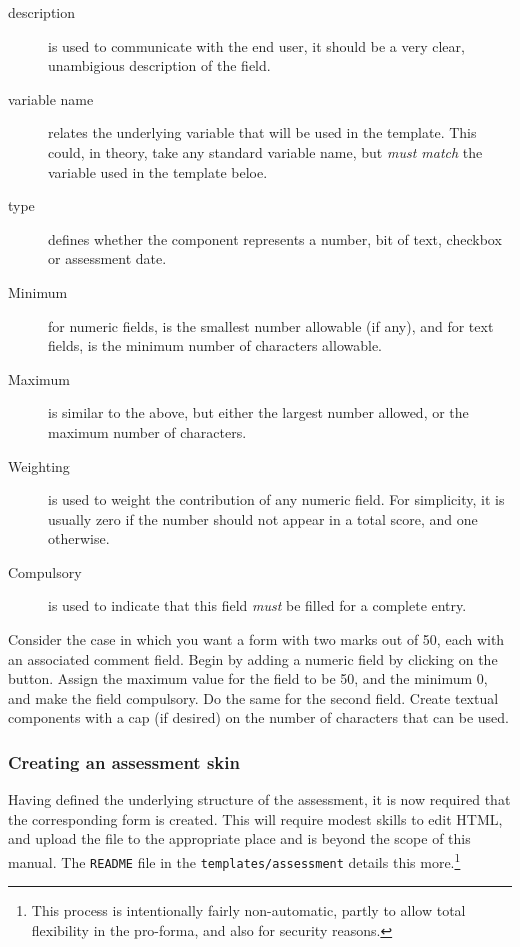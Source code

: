 \documentclass[12 pt]{book}
\begin{document}
\begin{description}
  \item[description] is used to communicate with the end user, it should
  be a very clear, unambigious description of the field.
  \item[variable name] relates the underlying variable that will be used
  in the template. This could, in theory, take any standard variable
  name, but \emph{must match} the variable used in the template beloe.
  \item[type] defines whether the component represents a number, bit of
  text, checkbox or assessment date.
  \item[Minimum] for numeric fields, is the smallest number allowable 
  (if any), and for text fields, is the minimum number of characters
  allowable.
  \item[Maximum] is similar to the above, but either the largest number
  allowed, or the maximum number of characters.
  \item[Weighting] is used to weight the contribution of any numeric
  field. For simplicity, it is usually zero if the number should not
  appear in a total score, and one otherwise.
  \item[Compulsory] is used to indicate that this field \emph{must} be
  filled for a complete entry.
\end{description}

Consider the case in which you want a form with two marks out of 50,
each with
an associated comment field. Begin by adding a numeric field by clicking
on the  button. Assign the maximum value for the field
to be 50, and the minimum 0, and make the field compulsory. Do the same
for the second field. Create textual components with a cap (if desired)
on the number of characters that can be used.

\subsubsection{Creating an assessment skin}

Having defined the underlying structure of the assessment, it is now
required that the corresponding form is created. This will require
modest skills to edit HTML, and upload the file to the appropriate place
and is beyond the scope of this manual. The \lstinline!README! file in the
\lstinline!templates/assessment! details this more.\footnote
{This process is intentionally fairly non-automatic, partly to allow
total flexibility in the pro-forma, and also for security reasons.}
\end{document}
